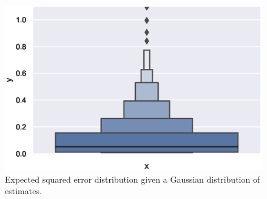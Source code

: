 \begin{figure}[htbp]
    \centering
    \includegraphics[scale=0.5]
    {./content/figures/expected_gaussian_distribution_squared_error}
    \caption{Expected squared error distribution given a Gaussian distribution
    of estimates.}
    \label{fig:expected_gaussian_distribution_squared_error}
\end{figure}

